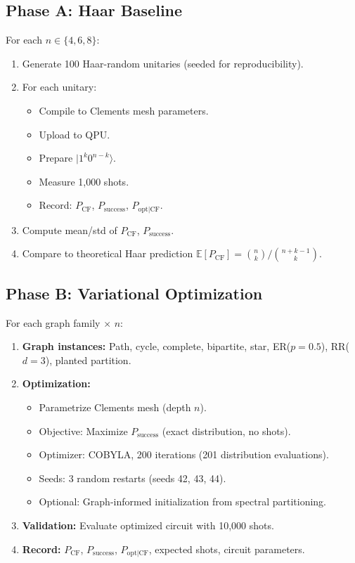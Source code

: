 \subsection{Phase A: Haar Baseline}

For each $n \in \{4,6,8\}$:
\begin{enumerate}
\item Generate 100 Haar-random unitaries (seeded for reproducibility).
\item For each unitary:
  \begin{itemize}
  \item Compile to Clements mesh parameters.
  \item Upload to QPU.
  \item Prepare $|1^k 0^{n-k}\rangle$.
  \item Measure 1,000 shots.
  \item Record: $P_{\mathrm{CF}}$, $P_{\mathrm{success}}$, $P_{\mathrm{opt|CF}}$.
  \end{itemize}
\item Compute mean/std of $P_{\mathrm{CF}}$, $P_{\mathrm{success}}$.
\item Compare to theoretical Haar prediction $\mathbb{E}[P_{\mathrm{CF}}] = \binom{n}{k}/\binom{n+k-1}{k}$.
\end{enumerate}

\subsection{Phase B: Variational Optimization}

For each graph family $\times$ $n$:
\begin{enumerate}
\item \textbf{Graph instances:} Path, cycle, complete, bipartite, star, ER($p=0.5$), RR($d=3$), planted partition.
\item \textbf{Optimization:}
  \begin{itemize}
  \item Parametrize Clements mesh (depth $n$).
  \item Objective: Maximize $P_{\mathrm{success}}$ (exact distribution, no shots).
  \item Optimizer: COBYLA, 200 iterations (201 distribution evaluations).
  \item Seeds: 3 random restarts (seeds 42, 43, 44).
  \item Optional: Graph-informed initialization from spectral partitioning.
  \end{itemize}
\item \textbf{Validation:} Evaluate optimized circuit with 10,000 shots.
\item \textbf{Record:} $P_{\mathrm{CF}}$, $P_{\mathrm{success}}$, $P_{\mathrm{opt|CF}}$, expected shots, circuit parameters.
\end{enumerate}

